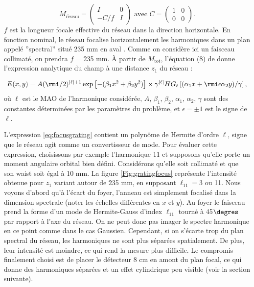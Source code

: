 \begin{equation*}
M_{\mathrm{r\acute{e}seau}} = \left(
\begin{array}{cc}
	I & 0 \\
	-C/f & I
\end{array} \right)\text{ avec } 
C = \left(
\begin{array}{cc}
	1 & 0 \\
	0 & 0
\end{array} \right).
\end{equation*}
$f$ est la longueur focale effective du réseau dans la direction horizontale. En fonction nominal, le réseau focalise horizontalement les harmoniques dans un plan appelé ''spectral'' situé 235 mm en aval . Comme on considère ici un faisceau collimaté, on prendra $f$ = 235 mm.
\`{A} partir de $M_{\mathrm{tot}}$, l'équation (8) de  donne l'expression analytique du champ à une distance $z_1$ du réseau :

\begin{equation}
E(x,y)=A(\rmi/2)^{|\ell|+1}\exp{\left[-(\beta_1 x^2+\beta_2 y^2)\right]}\times\gamma^{|\ell|} HG_\ell\left[(\alpha_1 x+\rmi\epsilon\alpha_2 y)/\gamma\right],
\label{eq:focusgrating}
\end{equation}
où $\ell$ est le MAO de l'harmonique considérée, $A$, $\beta_1$, $\beta_2$, $\alpha_1$, $\alpha_2$, $\gamma$ sont des constantes déterminées par les paramètres du problème, et $\epsilon=\pm1$ est le signe de $\ell$.

L'expression \ref{eq:focusgrating} contient un polynôme de Hermite d'ordre $\ell$, signe que le réseau agit comme un convertisseur de mode. Pour évaluer cette expression, choisissons par exemple l'harmonique 11 et supposons qu'elle porte un moment angulaire orbital bien défini. Considérons qu'elle soit collimaté et que son waist soit égal à 10 mm. La figure \ref{Fig:gratingfocus} représente l'intensité obtenue pour $z_1$ variant autour de 235 mm, en supposant $\ell_{11} = 3$ ou 11. Nous voyons d'abord qu'à l'écart du foyer, l'anneau est simplement focalisé dans la dimension spectrale (noter les échelles différentes en $x$ et $y$). Au foyer le faisceau prend la forme d'un mode de Hermite-Gauss d'index $\ell_{11}$ tourné à 45$\degres$ par rapport à l'axe du réseau. On ne peut donc pas imager le spectre harmonique en ce point comme dans le cas Gaussien. Cependant, si on s'écarte trop du plan spectral du réseau, les harmoniques ne sont plus séparées spatialement. De plus, leur intensité est moindre, ce qui rend la mesure plus difficile. Le compromis finalement choisi est de placer le détecteur 8 cm en amont du plan focal, ce qui donne des harmoniques séparées et un effet cylindrique peu visible (voir la section suivante).

